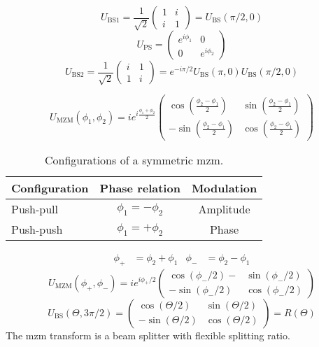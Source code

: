 \begin{equation}
	U_\text{BS1}
	=
	\frac{1}{\sqrt{2}}
	\begin{pmatrix}
		1 & i \\
		i & 1
	\end{pmatrix}
	=
	U_\text{BS}(\pi/2,0)	
\end{equation}
\begin{equation}
	U_\text{PS}
	=
	\begin{pmatrix}
		e^{i\phi_1} & 0 \\
		0 & e^{i\phi_2}
	\end{pmatrix}	
\end{equation}
\begin{equation}
	U_\text{BS2}
	=
	\frac{1}{\sqrt{2}}
	\begin{pmatrix}
		i & 1 \\
		1 & i
	\end{pmatrix}
	=
	e^{-i\pi/2}
	U_\text{BS}(\pi,0)
	U_\text{BS}(\pi/2,0)
\end{equation}

\begin{equation}
	U_\text{MZM}(\phi_1,\phi_2)
	=
	ie^{i\frac{\phi_1+\phi_2}{2}}
	\begin{pmatrix}
		\cos(\frac{\phi_2-\phi_1}{2}) & \sin(\frac{\phi_2-\phi_1}{2}) \\
		-\sin(\frac{\phi_2-\phi_1}{2}) & \cos(\frac{\phi_2-\phi_1}{2})
	\end{pmatrix}
\end{equation}
\begin{table}[htb]
	\centering
	\begin{tabular}{lcc}
		\toprule
		Configuration & Phase relation & Modulation \\
		\midrule
		Push-pull & $\phi_1=-\phi_2$ & Amplitude \\
		Push-push & $\phi_1=+\phi_2$ & Phase \\
		\bottomrule
	\end{tabular}
	\caption{Configurations of a symmetric \gls{mzm}.}
\end{table}
\begin{align}
	\phi_+
	&=
	\phi_2+\phi_1
	&
	\phi_-
	&=
	\phi_2-\phi_1
\end{align}
\begin{equation}
	U_\text{MZM}(\phi_+,\phi_-)
	=
	ie^{i\phi_+/2}
	\begin{pmatrix}
		\cos(\phi_-/2)- & \sin(\phi_-/2) \\
		-\sin(\phi_-/2) & \cos(\phi_-/2)
	\end{pmatrix}
\end{equation}
\begin{equation}
	U_\text{BS}(\Theta,3\pi/2)
	=
	\begin{pmatrix}
		\cos(\Theta/2) & \sin(\Theta/2) \\
		-\sin(\Theta/2) & \cos(\Theta/2)
	\end{pmatrix}
	=
	R(\Theta)
\end{equation}
The \gls{mzm} transform is a beam splitter with flexible splitting ratio.

